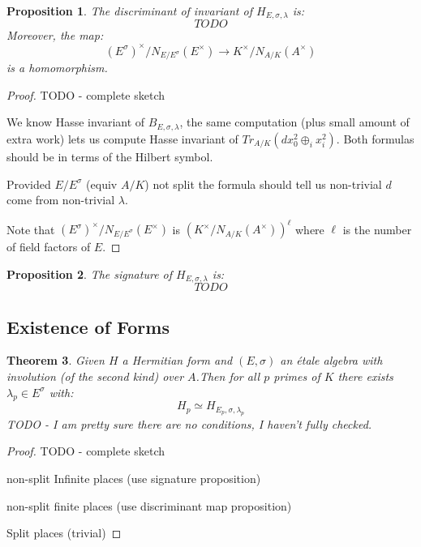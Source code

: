\documentclass{article}
\theoremstyle{plain}
\newtheorem{theorem}{Theorem}[section]
\newtheorem{proposition}[theorem]{Proposition}
\theoremstyle{definition}
\begin{document}
\begin{proposition}
The discriminant of invariant of $H_{E,\sigma,\lambda}$ is:
\[ TODO \]
Moreover, the map:
\[ (E^\sigma)^\times/N_{E/E^\sigma}(E^\times) \rightarrow K^\times/N_{A/K}(A^\times) \]
is a homomorphism.
\end{proposition}
\begin{proof}
TODO - complete sketch

We know Hasse invariant of $B_{E,\sigma,\lambda}$, the same computation (plus small amount of extra work) lets us compute Hasse invariant of $Tr_{A/K}(dx_0^2 \oplus_i x_i^2)$.
Both formulas should be in terms of the Hilbert symbol.

Provided $E/E^\sigma$ (equiv $A/K$) not split the formula should tell us non-trivial $d$ come from non-trivial $\lambda$.

Note that  $(E^\sigma)^\times/N_{E/E^\sigma}(E^\times)$ is $( K^\times/N_{A/K}(A^\times))^\ell$ where $\ell$ is the number of field factors of $E$.
\end{proof}

\begin{proposition}
The signature of $H_{E,\sigma,\lambda}$ is:
\[ TODO \]
\end{proposition}

\subsection{Existence of Forms}

\begin{theorem}
Given $H$ a Hermitian form and $(E,\sigma)$ an \'etale algebra with involution (of the second kind) over $A$.Then for all $p$ primes of $K$ there exists $\lambda_p \in E^\sigma$ with:
\[ H_p \simeq H_{E_p,\sigma,\lambda_p} \]
TODO - I am pretty sure there are no conditions, I haven't fully checked.
\end{theorem}
\begin{proof}
TODO - complete sketch

non-split Infinite places (use signature proposition)

non-split finite places (use discriminant map proposition)

Split places (trivial)
\end{proof}
\end{document}
